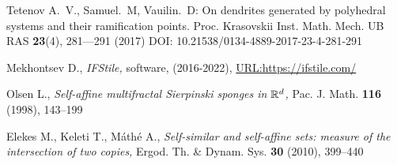 \begin{thebibliography}{99}
Tetenov A.~V., Samuel.~M, Vauilin.~D:
On dendrites generated by polyhedral systems and their ramification points.  Proc.  Krasovskii Inst. Math. Mech. UB RAS \textbf{23}(4), 281---291 (2017) DOI: 10.21538/0134-4889-2017-23-4-281-291




    {\sc Mekhontsev D.,}
    {\em IFStile,} 
    {software, (2016-2022), \href{https://ifstile.com/}{URL:https://ifstile.com/}} 

    {\sc Olsen L.,}
    {\em Self-affine multifractal Sierpinski sponges in $\mathbb{R}^d$,}
    {Pac. J. Math. \textbf{116} (1998), 143--199}

    {\sc Elekes M., Keleti T., M\'ath\'e A.,}
    {\em Self-similar and self-affine sets: measure of the intersection of two copies,}
    {Ergod. Th. \& Dynam. Sys. \textbf{30} (2010), 399--440}


\end{thebibliography}